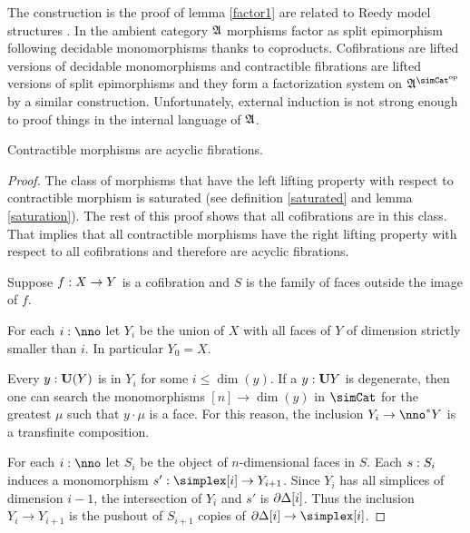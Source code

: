 \documentclass[csh.tex]{subfiles}
\begin{document}
\begin{remark} The construction is the proof of lemma \ref{factor1} are related to Reedy model structures \citep{Reedy74}. In the ambient category $\mathfrak A$ morphisms factor as split epimorphism following decidable monomorphisms thanks to coproducts. Cofibrations are lifted versions of decidable monomorphisms and contractible fibrations are lifted versions of split epimorphisms and they form a factorization system on $\ambient\s$ by a similar construction. Unfortunately, external induction is not strong enough to proof things in the internal language of $\mathfrak A$.
\end{remark}

\begin{lemma} Contractible morphisms are acyclic fibrations.\label{Reedy}\end{lemma}

\begin{proof} The class of morphisms that have the left lifting property with respect to contractible morphism is saturated (see definition \ref{saturated} and lemma \ref{saturation}). The rest of this proof shows that all cofibrations are in this class. That implies that all contractible morphisms have the right lifting property with respect to all cofibrations and therefore are acyclic fibrations.

Suppose $f: X\to Y$ is a cofibration and $S$ is the family of faces outside the image of $f$.


For each $i\of\nno$ let $Y_i$ be the union of $X$ with all faces of $Y$ of dimension strictly smaller than $i$. In particular $Y_0=X$.

Every $y:\mathbf{U}(Y)$ is in $Y_i$ for some $i\leq \dim(y)$. If a $y:\mathbf{U} Y$ is degenerate, then one can search the monomorphisms $[n]\to\dim(y)$ in $\simCat$ for the greatest $\mu$ such that $y\cdot\mu$ is a face. For this reason, the inclusion $Y_i\to\nno\ri Y$ is a transfinite composition.

For each $i\of\nno$ let $S_i$ be the object of $n$-dimensional faces in $S$. Each $s: S_i$ induces a monomorphism $s'\of\simplex[i]\to Y_{i+1}$. Since $Y_{i}$ has all simplices of dimension $i-1$, the intersection of $Y_i$ and $s'$ is $\partial\Delta[i]$. Thus the inclusion $Y_i\to Y_{i+1}$ is the pushout of $S_{i+1}$ copies of $\cycle[i]\to\simplex[i]$.
\end{proof}
\end{document}
